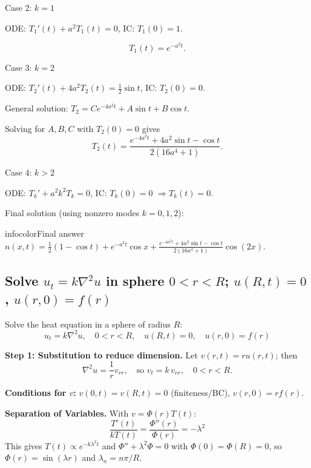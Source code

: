 \documentclass[a4paper,11pt]{article} %
\newenvironment{summarybox}[1][]{\begin{custombox}[#1]{infocolor}{Final answer}}{\end{custombox}}
\begin{document}
Case 2: \(k=1\)

ODE: \(T_1'(t) + a^2 T_1(t) = 0\), IC: \(T_1(0) = 1\).

\[
T_1(t) = e^{-a^2 t}.
\]

Case 3: \(k=2\)

ODE: \(T_2'(t) + 4a^2 T_2(t) = \tfrac12\sin t\), IC: \(T_2(0) = 0\).

General solution: \(T_2 = C e^{-4a^2 t} + A\sin t + B\cos t\).

Solving for \(A,B,C\) with \(T_2(0)=0\) gives
\[
T_2(t) = \frac{e^{-4a^2 t} + 4a^2\sin t - \cos t}{2(16a^4+1)}.
\]

Case 4: \(k>2\)

ODE: \(T_k' + a^2 k^2 T_k = 0\), IC: \(T_k(0)=0\) \(\Rightarrow T_k(t)=0\).

Final solution (using nonzero modes \(k=0,1,2\)):

\begin{summarybox}
$  n(x,t) = \frac12(1-\cos t)
+ e^{-a^2 t}\cos x
+ \frac{e^{-4a^2 t} + 4a^2\sin t - \cos t}{2(16a^4+1)}\cos(2x).
$
  
\end{summarybox}


\newpage
\subsection{\texorpdfstring{Solve $u_t = k\nabla^2 u$ in sphere $0<r<R$; $u(R,t)=0$, $u(r,0)=f(r)$}{Spherical heat equation: substitute v=ru to reduce to 1D heat eq; Fourier-sine series coefficients}}

\begin{problembox}
Solve the heat equation in a sphere of radius $R$:
$$u_t = k\nabla^2 u, \quad 0<r<R, \quad u(R,t)=0, \quad u(r,0)=f(r)$$
\end{problembox}

\textbf{Step 1: Substitution to reduce dimension.}
Let $v(r,t)=ru(r,t)$; then
\[
    \nabla^2 u = \frac{1}{r}v_{rr}, \quad \text{so } v_t = k\,v_{rr}, \quad 0<r<R.
\]

\textbf{Conditions for $v$:} $v(0,t)=v(R,t)=0$ (finiteness/BC), $v(r,0)=rf(r)$.

\textbf{Separation of Variables.} With $v=\Phi(r)T(t)$:
\begin{equation}
    \frac{T'(t)}{k T(t)} = \frac{\Phi''(r)}{\Phi(r)} = -\lambda^2
\end{equation}
This gives $T(t)\propto e^{-k\lambda^2 t}$ and $\Phi''+\lambda^2\Phi=0$ with $\Phi(0)=\Phi(R)=0$, so $\Phi(r)=\sin(\lambda r)$ and $\lambda_n=n\pi/R$.
\end{document}
